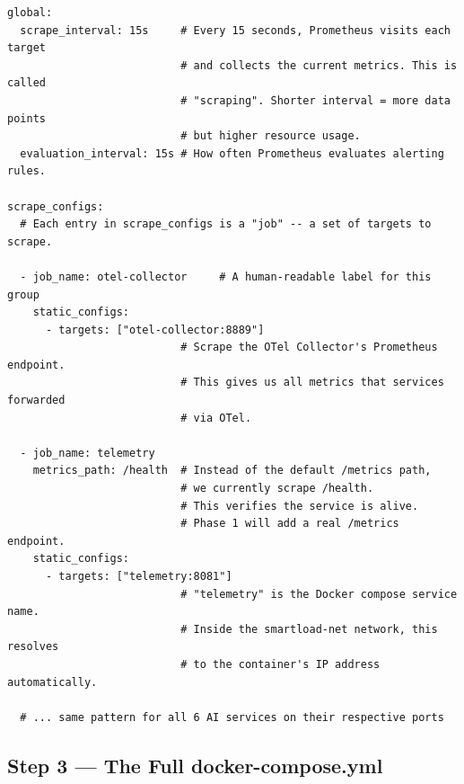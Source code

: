 \documentclass[12pt, a4paper]{article}
\begin{document}
\begin{lstlisting}[style=yaml, caption={infrastructure/prometheus/prometheus.yml}]
global:
  scrape_interval: 15s     # Every 15 seconds, Prometheus visits each target
                           # and collects the current metrics. This is called
                           # "scraping". Shorter interval = more data points
                           # but higher resource usage.
  evaluation_interval: 15s # How often Prometheus evaluates alerting rules.

scrape_configs:
  # Each entry in scrape_configs is a "job" -- a set of targets to scrape.

  - job_name: otel-collector     # A human-readable label for this group
    static_configs:
      - targets: ["otel-collector:8889"]
                           # Scrape the OTel Collector's Prometheus endpoint.
                           # This gives us all metrics that services forwarded
                           # via OTel.

  - job_name: telemetry
    metrics_path: /health  # Instead of the default /metrics path,
                           # we currently scrape /health.
                           # This verifies the service is alive.
                           # Phase 1 will add a real /metrics endpoint.
    static_configs:
      - targets: ["telemetry:8081"]
                           # "telemetry" is the Docker compose service name.
                           # Inside the smartload-net network, this resolves
                           # to the container's IP address automatically.

  # ... same pattern for all 6 AI services on their respective ports
\end{lstlisting}

\subsection{Step 3 --- The Full docker-compose.yml}
\label{sec:compose}
\end{document}
